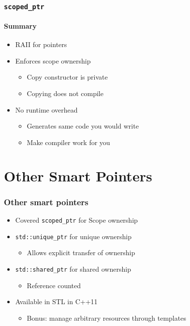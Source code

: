 \begin{frame}[fragile]
    \frametitle{\texttt{scoped\_ptr}}
    \framesubtitle{Summary}
    \begin{itemize}
        \item RAII for pointers
        \item Enforces scope ownership
            \begin{itemize}
                \item Copy constructor is private
                \item Copying does not compile
            \end{itemize}
        \item No runtime overhead
            \begin{itemize}
                \item Generates same code you would write
                \item Make compiler work for you
            \end{itemize}
    \end{itemize}
\end{frame}



\section{Other Smart Pointers}
\frame{\sectionpage}

\begin{frame}[fragile]
    \frametitle{Other smart pointers}
    \begin{itemize}
        \item Covered \texttt{scoped\_ptr} for Scope ownership
        \item \texttt{std::unique\_ptr} for unique ownership
            \begin{itemize}
                \item Allows explicit transfer of ownership
            \end{itemize}
        \item \texttt{std::shared\_ptr} for shared ownership
            \begin{itemize}
                \item Reference counted
            \end{itemize}
        \item Available in STL in C++11
            \begin{itemize}
                \item Bonus: manage arbitrary resources through templates
            \end{itemize}
    \end{itemize}
\end{frame}

